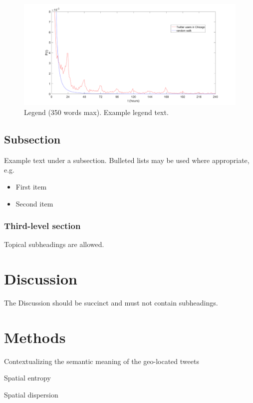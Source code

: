 \documentclass[fleqn,10pt]{wlscirep}
\begin{document}
\begin{figure}[ht]
\centering
\includegraphics[width=\linewidth]{firsttime}
\caption{Legend (350 words max). Example legend text.}
\label{fig:firsttime}
\end{figure}



\subsection*{Subsection}

Example text under a subsection. Bulleted lists may be used where appropriate, e.g.

\begin{itemize}
\item First item
\item Second item
\end{itemize}

\subsubsection*{Third-level section}
 
Topical subheadings are allowed.

\section*{Discussion}

The Discussion should be succinct and must not contain subheadings.

\section*{Methods}
Contextualizing the semantic meaning of the geo-located tweets

Spatial entropy

Spatial dispersion
\end{document}
